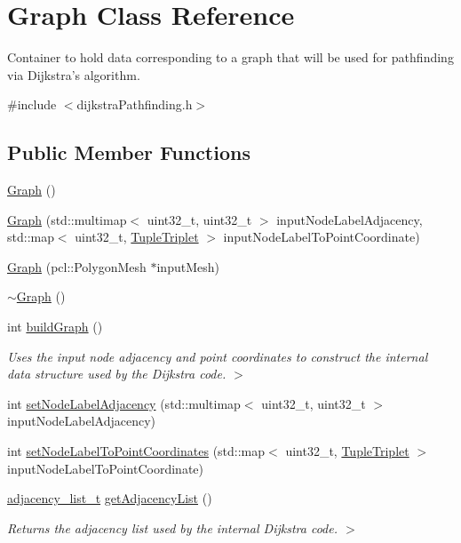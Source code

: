 \hypertarget{classGraph}{\section{Graph Class Reference}
\label{classGraph}
}


Container to hold data corresponding to a graph that will be used for pathfinding via Dijkstra's algorithm.  




{\ttfamily \#include $<$dijkstra\-Pathfinding.\-h$>$}

\subsection*{Public Member Functions}
\begin{DoxyCompactItemize}
\item 
\hyperlink{classGraph_ae4c72b8ac4d693c49800a4c7e273654f}{Graph} ()
\item 
\hyperlink{classGraph_a5931d933e409b90b4343c0d7061bde34}{Graph} (std\-::multimap$<$ uint32\-\_\-t, uint32\-\_\-t $>$ input\-Node\-Label\-Adjacency, std\-::map$<$ uint32\-\_\-t, \hyperlink{tupleTriplet_8h_a0cdd11cd4d27abbb7b778a8fee3b2397}{Tuple\-Triplet} $>$ input\-Node\-Label\-To\-Point\-Coordinate)
\item 
\hyperlink{classGraph_a54abed46b8823658542b2125df3e121e}{Graph} (pcl\-::\-Polygon\-Mesh $\ast$input\-Mesh)
\item 
\hyperlink{classGraph_a902c5b3eacb66d60752525ab23297a95}{$\sim$\-Graph} ()
\item 
int \hyperlink{classGraph_a104553164f05adc9ef6ab2b5c0972d9b}{build\-Graph} ()
\begin{DoxyCompactList}\small\item\em Uses the input node adjacency and point coordinates to construct the internal data structure used by the Dijkstra code. $>$ \end{DoxyCompactList}\item 
int \hyperlink{classGraph_a31f238c112af88d1deeaf3920997192a}{set\-Node\-Label\-Adjacency} (std\-::multimap$<$ uint32\-\_\-t, uint32\-\_\-t $>$ input\-Node\-Label\-Adjacency)
\item 
int \hyperlink{classGraph_a82968068ef79a1a18160630962d08b98}{set\-Node\-Label\-To\-Point\-Coordinates} (std\-::map$<$ uint32\-\_\-t, \hyperlink{tupleTriplet_8h_a0cdd11cd4d27abbb7b778a8fee3b2397}{Tuple\-Triplet} $>$ input\-Node\-Label\-To\-Point\-Coordinate)
\item 
\hyperlink{dijkstraPathfinding_8h_a8c1d6029622c85b0c047b344a90a6f84}{adjacency\-\_\-list\-\_\-t} \hyperlink{classGraph_a64488ecea2d5bcacdcc3294fd497a929}{get\-Adjacency\-List} ()
\begin{DoxyCompactList}\small\item\em Returns the adjacency list used by the internal Dijkstra code. $>$ \end{DoxyCompactList}\end{DoxyCompactItemize}
